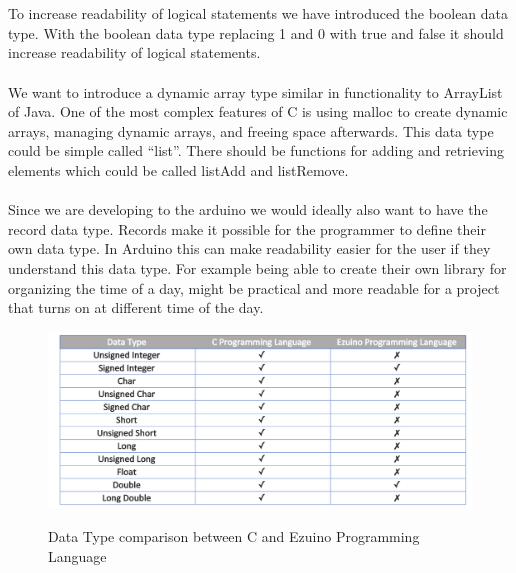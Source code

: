 \\\\
To increase readability of logical statements we have introduced the boolean data type. With the boolean data type replacing 1 and 0 with true and false it should increase readability of logical statements.
\\ \\
We want to introduce a dynamic array type similar in functionality to ArrayList of Java. One of the most complex features of C is using malloc to create dynamic arrays, managing dynamic arrays, and freeing space afterwards. This data type could be simple called “list”. There should be functions for adding and retrieving elements which could be called listAdd and listRemove.
\\ \\
Since we are developing to the arduino we would ideally also want to have the record data type. Records make it possible for the programmer to define their own data type. In Arduino this can make readability easier for the user if they understand this data type. For example being able to create their own library for organizing the time of a day, might be practical and more readable for a project that turns on at different time of the day.  
\begin{figure}[H]
\centering
\caption{Data Type comparison between C and Ezuino Programming Language}
\includegraphics[scale=0.60]{figures/language_features/langf01.png}
\label{lf01}
\end{figure}
